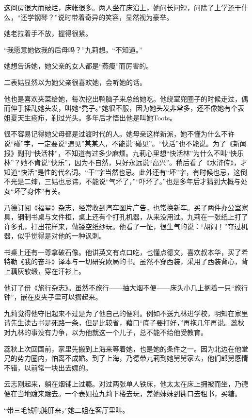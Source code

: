 \par 这间房很大而破烂，床帐很多。两人坐在床沿上，她问长问短，问除了上学还干什么，“还学钢琴？”说时带着奇异的笑容，显然视为豪举。
\par 她老拉着手不放，握得很紧。
\par “我愿意她做我的后母吗？”九莉想。“不知道。”
\par 她想告诉她，她父亲的女人都是“燕瘦”而厉害的。
\par 二表姑显然以为她父亲很喜欢她，会听她的话。
\par 他也是喜欢夹菜给她，每次挖出鸭脑子来总给她吃。他绕室兜圈子的时候走过，偶而伸手揉乱她头发，叫她“秃子。”她很不服，因为她头发非常多，还不像她有个表姐夏天生疮疖，剃过光头。多年后才悟出他是叫她Toots。
\par 很不容易记得她父母都是过渡时代的人。她母亲这样新派，她不懂为什么不许说“碰”字，一定要说“遇见”某某人，不能说“碰见”。“快活”也不能说。为了《新闻报》副刊“快活林”，不知道有过多少麻烦。九莉心里想“快活林”为什么不叫“快乐林”？她不肯说“快乐”，因为不自然，只好永远说“高兴”。稍后看了《水浒传》，才知道“快活”是性的代名词。“干”字当然也忌。此外还有“坏”字，有时候也忌，这倒不光是二婶，三姑也忌讳，不能说“气坏了，”“吓坏了。”也是多年后才猜到大概与处女“坏了身体”有关。
\par 乃德订阅《福星》杂志，经常收到汽车图片广告，也常换新车。买了两件办公室家具，钢制书桌与文件柜，桌上还有个打孔机器，从来没用过。九莉在一张纸上打了许多孔，打出花样来，做镂空纸纱玩。他看了一怔，很生气的说：“胡闹！”夺过机器，似乎觉得是对他的一种讽刺。
\par 书桌上还有一尊拿破石像。他讲英文有点口吃，也懂点德文，喜欢叔本华，买了希特勒《我的奋斗》译本与一切研究欧局的书。虽然不穿西装，采用了西装背心，背上藕灰软缎，穿在汗衫上。
\par 他订了份《旅行杂志》。虽然不旅行——抽大烟不便——床头小几上搁着一只“旅行钟”，嵌在皮夹子里可以摺起来。
\par 九莉觉得他守旧起来不过是为了他自己的便利。例如不送九林进学校，明知在家里请先生读古书是死路一条，但是比较省，藉口“底子要打好，”再拖几年再说。蕊秋对九林的事没有力争，以为他就这一个儿子，总不能不给他受教育。
\par 蕊秋上次回国前，家里先搬到上海来等着她，也是她的条件之一。因为北边在他堂兄的势力圈内，怕离不成婚。到了上海，乃德带九莉到她舅舅家去，他们郎舅感情不错，以前常一块出去嫖的。
\par 云志刚起来，躺在烟铺上过瘾。对过两张单人铁床，他太太在床上拥被而坐，乃德便在当地踱来踱去。一个表姐拉九莉下楼去玩，差她妹妹到衖口去租书，买糖。
\par “带三毛钱鸭肫肝来，”她二姐在客厅里叫。
